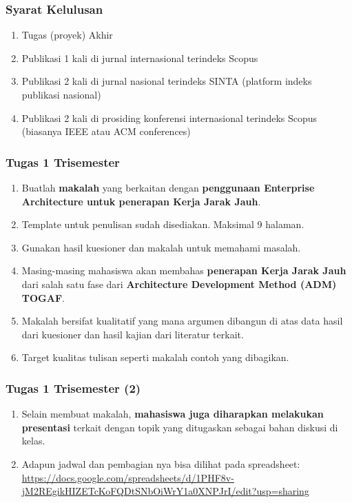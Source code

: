 \documentclass[aspectratio=169]{beamer}
\begin{document}
	\begin{frame}
		\frametitle{Syarat Kelulusan}
		\begin{enumerate}
			\item Tugas (proyek) Akhir 			
			\item Publikasi 1 kali di jurnal internasional terindeks Scopus
			\item Publikasi 2 kali di jurnal nasional terindeks SINTA (platform indeks publikasi nasional)
			\item Publikasi 2 kali di prosiding konferensi internasional terindeks Scopus (biasanya IEEE atau ACM conferences)
		\end{enumerate}
	\end{frame}
	
	\begin{frame}
		\frametitle{Tugas 1 Trisemester}
		\begin{enumerate}
			\item Buatlah \textbf{makalah} yang berkaitan dengan \textbf{penggunaan Enterprise Architecture untuk penerapan Kerja Jarak Jauh}.
			\item Template untuk penulisan sudah disediakan. Maksimal 9 halaman. 
			\item Gunakan hasil kuesioner dan makalah untuk memahami masalah.
			\item Masing-masing mahasiswa akan membahas \textbf{penerapan Kerja Jarak Jauh} dari salah satu fase dari \textbf{Architecture Development Method (ADM) TOGAF}.
			\item Makalah bersifat kualitatif yang mana argumen dibangun di atas data hasil dari kuesioner dan hasil kajian dari literatur terkait.
			\item Target kualitas tulisan seperti makalah contoh yang dibagikan.
		\end{enumerate}
	\end{frame}

		\begin{frame}
		\frametitle{Tugas 1 Trisemester (2)}
		\begin{enumerate}
			\item Selain membuat makalah, \textbf{mahasiswa juga diharapkan melakukan presentasi} terkait dengan topik yang ditugaskan sebagai bahan diskusi di kelas. 
			\item Adapun jadwal dan pembagian nya bisa dilihat pada spreadsheet:  \url{https://docs.google.com/spreadsheets/d/1PHF8v-jM2REgikHIZETcKoFQDtSNbOiWrY1a0XNPJrI/edit?usp=sharing}
		\end{enumerate}
	\end{frame}
\end{document}
